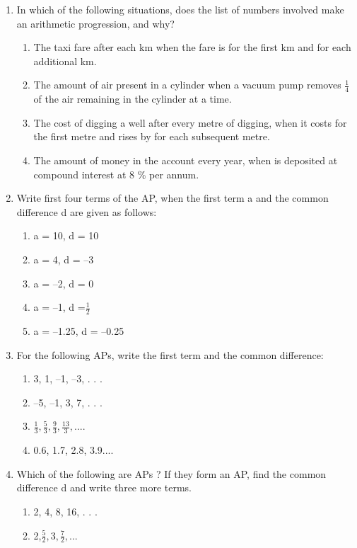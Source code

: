 \renewcommand{\theequation}{\theenumi}
\begin{enumerate}[label=\arabic*.,ref=\thesubsection.\theenumi]
\item In which of the following situations, does the list of numbers involved make an arithmetic progression, and why?
\begin{enumerate}
\item The taxi fare after each km when the fare is  for the first km and  for each additional km.
\item The amount of air present in a cylinder when a vacuum pump removes 
$\frac{1}{4}$ of the air remaining in the cylinder at a time.
\item  The cost of digging a well after every metre of digging, when it costs  for the first metre and rises by  for each subsequent metre.
\item The amount of money in the account every year, when  is deposited at compound interest at 8 \% per annum.
\end{enumerate}
\item Write first four terms of the AP, when the first term a and the common difference d are
given as follows:
\begin{enumerate}
\item a = 10, d = 10
\item a = 4, d = –3
\item a = –2, d = 0
\item  a = –1, d =$\frac{1}{2}$
\item a = –1.25, d = –0.25
\end{enumerate}
\item For the following APs, write the first term and the common difference:
\begin{enumerate}
\item 3, 1, –1, –3, . . .
\item –5, –1, 3, 7, . . .
\item $\frac{1}{3}, \frac{5}{3}, \frac{9}{3}, \frac{13}{3},....$
\item 0.6, 1.7, 2.8, 3.9....
\end{enumerate}
\item Which of the following are APs ? If they form an AP, find the common difference d and
write three more terms.
\begin{enumerate}
\item 2, 4, 8, 16, . . .
\item 2,$\frac{5}{2}, 3, \frac{7}{2},...$

\end{enumerate}
\end{enumerate}
